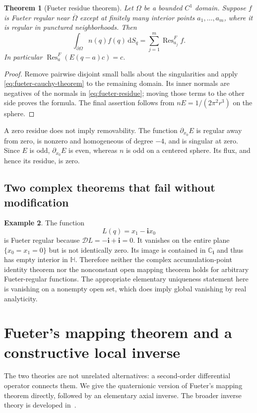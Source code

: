 \documentclass[11pt,a4paper]{article}
\numberwithin{equation}{section}
\newtheorem{theorem}{Theorem}[section]
\theoremstyle{definition}
\newtheorem{example}[theorem]{Example}
\theoremstyle{remark}
\newcommand{\C}{\mathbb C}
\newcommand{\HH}{\mathbb H}
\newcommand{\ii}{\mathbf i}
\newcommand{\cD}{\mathcal D}
\newcommand{\Res}{\operatorname{Res}}
\newcommand{\dd}{\,\mathrm d}
\begin{document}
\begin{theorem}[Fueter residue theorem]\label{thm:fueter-residue}
Let $\Omega$ be a bounded $C^1$ domain. Suppose $f$ is Fueter regular near
$\overline\Omega$ except at finitely many
interior points $a_1,\ldots,a_m$, where it is regular in punctured
neighborhoods. Then
\begin{equation}\label{eq:fueter-residue-theorem}
 \int_{\partial\Omega}n(q)f(q)\dd S_q
       =\sum_{j=1}^m\Res^F_{a_j}f.
\end{equation}
In particular $\Res^F_a(E(q-a)c)=c$.
\end{theorem}
\begin{proof}
Remove pairwise disjoint small balls about the singularities and apply
\eqref{eq:fueter-cauchy-theorem} to the remaining domain. Its inner normals
are negatives of the normals in \eqref{eq:fueter-residue}; moving those
terms to the other side proves the formula. The final assertion follows
from $nE=1/(2\pi^2r^3)$ on the sphere.
\end{proof}
A zero residue does not imply removability. The function $\partial_{x_0}E$
is regular away from zero, is nonzero and homogeneous of degree $-4$, and
is singular at zero. Since $E$ is odd, $\partial_{x_0}E$ is even, whereas
$n$ is odd on a centered sphere. Its flux, and hence its residue, is zero.

\subsection{Two complex theorems that fail without modification}
\begin{example}\label{ex:fueter-plane}
The function
\begin{equation}\label{eq:fueter-plane}
 L(q)=x_1-\ii x_0
\end{equation}
is Fueter regular because $\cD L=-\ii+\ii=0$. It vanishes on the entire
plane $\{x_0=x_1=0\}$ but is not identically zero. Its image is contained in
$\C_\ii$ and thus has empty interior in $\HH$. Therefore neither the
complex accumulation-point identity theorem nor the nonconstant open
mapping theorem holds for arbitrary Fueter-regular functions. The
appropriate elementary uniqueness statement here is vanishing on a
nonempty open set, which does imply global vanishing by real analyticity.
\end{example}

\section{Fueter's mapping theorem and a constructive local inverse}
\label{sec:fueter-map}
The two theories are not unrelated alternatives: a second-order
differential operator connects them. We give the quaternionic version of
Fueter's mapping theorem directly, followed by an elementary axial inverse.
The broader inverse theory is developed in~\cite{CSSInverse,CPSSInverse}.
\end{document}
